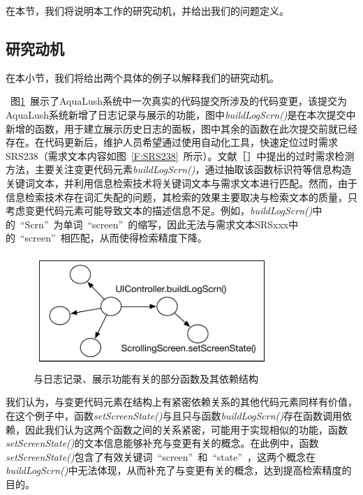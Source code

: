 在本节，我们将说明本工作的研究动机，并给出我们的问题定义。

\subsection{研究动机}

在本小节，我们将给出两个具体的例子以解释我们的研究动机。

~图\ref{F:BuildLogScrn}~展示了AquaLush系统中一次真实的代码提交所涉及的代码变更，该提交为AquaLush系统新增了日志记录与展示的功能，图中\emph{buildLogScrn()}是在本次提交中新增的函数，用于建立展示历史日志的面板，图中其余的函数在此次提交前就已经存在。在代码更新后，维护人员希望通过使用自动化工具，快速定位过时需求SRS238（需求文本内容如图~\ref{F:SRS238}~所示）。文献［］中提出的过时需求检测方法，主要关注变更代码元素\emph{buildLogScrn()}，通过抽取该函数标识符等信息构造关键词文本，并利用信息检索技术将关键词文本与需求文本进行匹配。然而，由于信息检索技术存在词汇失配的问题，其检索的效果主要取决与检索文本的质量，只考虑变更代码元素可能导致文本的描述信息不足。例如，\emph{buildLogScrn()}中的\ “Scrn”\ 为单词\ “screen”\ 的缩写，因此无法与需求文本SRSxxx中的\ “screen”\ 相匹配，从而使得检索精度下降。

\begin{figure}[thb]
    \centering
    \includegraphics[width=0.8\textwidth]{./figures/example/buildLogScrn.pdf}
    \caption{与日志记录、展示功能有关的部分函数及其依赖结构}
    \label{F:BuildLogScrn}
\end{figure}

我们认为，与变更代码元素在结构上有紧密依赖关系的其他代码元素同样有价值，在这个例子中，函数\emph{setScreenState()}与且只与函数\emph{buildLogScrn()}存在函数调用依赖，因此我们认为这两个函数之间的关系紧密，可能用于实现相似的功能，函数\emph{setScreenState()}的文本信息能够补充与变更有关的概念。在此例中，函数\emph{setScreenState()}包含了有效关键词\ “screen”\ 和\ “state”\ ，这两个概念在\emph{buildLogScrn()}中无法体现，从而补充了与变更有关的概念，达到提高检索精度的目的。

